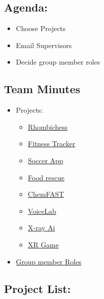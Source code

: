 \documentclass{article}
\begin{document}
\subsection*{Agenda:}
\begin{itemize}
    \item Choose Projects
    \item Email Supervisors
    \item Decide group member roles
\end{itemize}


\subsection*{Team Minutes}
\begin{itemize}
    \item Projects:
    \begin{itemize}
        \item \hyperref[subsec:chess]{Rhombichess}
        \item \hyperref[subsec:fitness]{Fitness Tracker}
        \item \hyperref[subsec:soccer]{Soccer App}
        \item \hyperref[subsec:foodrescue]{Food rescue}
        \item \hyperref[subsec:chemfast]{ChemFAST}
        \item \hyperref[subsec:voicelab]{VoiceLab}
        \item \hyperref[subsec:xray]{X-ray Ai}
        \item \hyperref[subsec:xrgame]{XR Game}
    \end{itemize}
    \item \hyperref[sec:roles]{Group member Roles}
\end{itemize}
\subsection*{Project List:}
\end{document}
